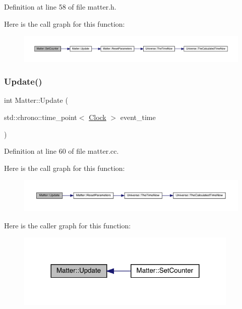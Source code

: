 Definition at line 58 of file matter.\+h.

Here is the call graph for this function\+:
\nopagebreak
\begin{figure}[H]
\begin{center}
\leavevmode
\includegraphics[width=350pt]{class_matter_a514b4a64589eb3fbc3db6b3b356bd687_cgraph}
\end{center}
\end{figure}
\mbox{\label{class_matter_a56898dd51e5a675832bc82de285b3ef7}} 
\subsubsection{\texorpdfstring{Update()}{Update()}}
{\footnotesize\ttfamily int Matter\+::\+Update (\begin{DoxyParamCaption}\item[{std\+::chrono\+::time\+\_\+point$<$ \hyperlink{universe_8h_a0ef8d951d1ca5ab3cfaf7ab4c7a6fd80}{Clock} $>$}]{event\+\_\+time }\end{DoxyParamCaption})}



Definition at line 60 of file matter.\+cc.

Here is the call graph for this function\+:
\nopagebreak
\begin{figure}[H]
\begin{center}
\leavevmode
\includegraphics[width=350pt]{class_matter_a56898dd51e5a675832bc82de285b3ef7_cgraph}
\end{center}
\end{figure}
Here is the caller graph for this function\+:
\nopagebreak
\begin{figure}[H]
\begin{center}
\leavevmode
\includegraphics[width=300pt]{class_matter_a56898dd51e5a675832bc82de285b3ef7_icgraph}
\end{center}
\end{figure}


